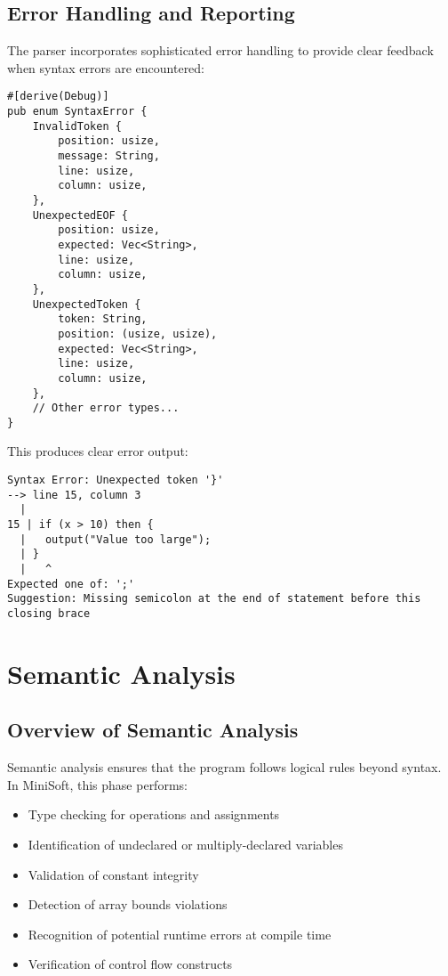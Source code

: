 \documentclass[12pt,a4paper]{article}
\begin{document}
\subsection{Error Handling and Reporting}
The parser incorporates sophisticated error handling to provide clear feedback when syntax errors are encountered:

\begin{lstlisting}[caption={Syntax Error Types}]
#[derive(Debug)]
pub enum SyntaxError {
    InvalidToken {
        position: usize,
        message: String,
        line: usize,
        column: usize,
    },
    UnexpectedEOF {
        position: usize,
        expected: Vec<String>,
        line: usize,
        column: usize,
    },
    UnexpectedToken {
        token: String,
        position: (usize, usize),
        expected: Vec<String>,
        line: usize,
        column: usize,
    },
    // Other error types...
}
\end{lstlisting}

This produces clear error output:

\begin{lstlisting}[caption={Syntax Error Output}]
Syntax Error: Unexpected token '}'
--> line 15, column 3
  |
15 | if (x > 10) then {
  |   output("Value too large");
  | }
  |   ^
Expected one of: ';'
Suggestion: Missing semicolon at the end of statement before this closing brace
\end{lstlisting}

\section{Semantic Analysis}
\subsection{Overview of Semantic Analysis}
Semantic analysis ensures that the program follows logical rules beyond syntax. In MiniSoft, this phase performs:

\begin{itemize}
	\item Type checking for operations and assignments
	\item Identification of undeclared or multiply-declared variables
	\item Validation of constant integrity
	\item Detection of array bounds violations
	\item Recognition of potential runtime errors at compile time
	\item Verification of control flow constructs
\end{itemize}
\end{document}
